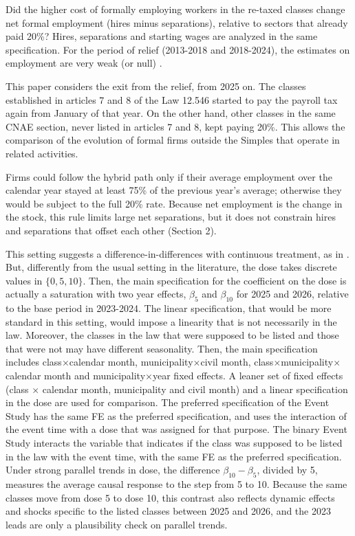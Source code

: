 \documentclass[12pt,a4paper]{article}
\begin{document}
Did the higher cost of formally employing workers in the re-taxed classes change net formal employment (hires minus separations), relative to sectors that already paid 20\%? Hires, separations and starting wages are analyzed in the same specification. For the period of relief (2013-2018 and 2018-2024), the estimates on employment are very weak (or null) \citep{reckziegel2024, albernaz2025}.

This paper considers the exit from the relief, from 2025 on. The classes established in articles 7 and 8 of the Law 12.546 started to pay the payroll tax again from January of that year. On the other hand, other classes in the same CNAE section, never listed in articles 7 and 8, kept paying 20\%. This allows the comparison of the evolution of formal firms outside the Simples that operate in related activities.

Firms could follow the hybrid path only if their average employment over the calendar year stayed at least 75\% of the previous year's average; otherwise they would be subject to the full 20\% rate. Because net employment is the change in the stock, this rule limits large net separations, but it does not constrain hires and separations that offset each other (Section 2).

This setting suggests a difference-in-differences with continuous treatment, as in \citet{callaway2024}. But, differently from the usual setting in the literature, the dose takes discrete values in $\{0,5,10\}$. Then, the main specification for the coefficient on the dose is actually a saturation with two year effects, $\beta_{5}$ and $\beta_{10}$ for 2025 and 2026, relative to the base period in 2023-2024. The linear specification, that would be more standard in this setting, would impose a linearity that is not necessarily in the law. Moreover, the classes in the law that were supposed to be listed and those that were not may have different seasonality. Then, the main specification includes class$\times$calendar month, municipality$\times$civil month, class$\times$municipality$\times$calendar month and municipality$\times$year fixed effects. A leaner set of fixed effects (class $\times$ calendar month, municipality and civil month) and a linear specification in the dose are used for comparison. The preferred specification of the Event Study has the same FE as the preferred specification, and uses the interaction of the event time with a dose that was assigned for that purpose. The binary Event Study interacts the variable that indicates if the class was supposed to be listed in the law with the event time, with the same FE as the preferred specification. Under strong parallel trends in dose, the difference $\beta_{10}-\beta_5$, divided by 5, measures the average causal response to the step from 5 to 10. Because the same classes move from dose 5 to dose 10, this contrast also reflects dynamic effects and shocks specific to the listed classes between 2025 and 2026, and the 2023 leads are only a plausibility check on parallel trends.
\end{document}
